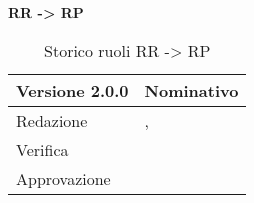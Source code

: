 \textbf{RR -> RP}
\label{tabVers2}
\begin{table}[h]
	\begin{tabular}{p{} p{}}
		\toprule \textbf{Versione 2.0.0}	&	\textbf{Nominativo}\\
		\midrule Redazione	& \PM, \BM \\
		\midrule Verifica &	\TP\\
		\midrule Approvazione	& \VG \\
		\bottomrule
	\end{tabular}
	\caption{Storico ruoli RR -> RP}
\end{table}